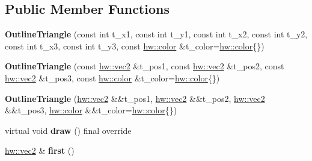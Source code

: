\subsection*{Public Member Functions}
\begin{DoxyCompactItemize}
\item 
\mbox{\label{classdummy__api_1_1OutlineTriangle_aaab9f7962173eb4337145d2138392365}} 
{\bfseries Outline\+Triangle} (const int t\+\_\+x1, const int t\+\_\+y1, const int t\+\_\+x2, const int t\+\_\+y2, const int t\+\_\+x3, const int t\+\_\+y3, const \mbox{\hyperlink{structhw_1_1color}{hw\+::color}} \&t\+\_\+color=\mbox{\hyperlink{structhw_1_1color}{hw\+::color}}\{\})
\item 
\mbox{\label{classdummy__api_1_1OutlineTriangle_a1f7689e4ea87c9e13a8ff4ff8be32383}} 
{\bfseries Outline\+Triangle} (const \mbox{\hyperlink{structhw_1_1vec2}{hw\+::vec2}} \&t\+\_\+pos1, const \mbox{\hyperlink{structhw_1_1vec2}{hw\+::vec2}} \&t\+\_\+pos2, const \mbox{\hyperlink{structhw_1_1vec2}{hw\+::vec2}} \&t\+\_\+pos3, const \mbox{\hyperlink{structhw_1_1color}{hw\+::color}} \&t\+\_\+color=\mbox{\hyperlink{structhw_1_1color}{hw\+::color}}\{\})
\item 
\mbox{\label{classdummy__api_1_1OutlineTriangle_ae001ee8f81b7441a481f7b170f3e517e}} 
{\bfseries Outline\+Triangle} (\mbox{\hyperlink{structhw_1_1vec2}{hw\+::vec2}} \&\&t\+\_\+pos1, \mbox{\hyperlink{structhw_1_1vec2}{hw\+::vec2}} \&\&t\+\_\+pos2, \mbox{\hyperlink{structhw_1_1vec2}{hw\+::vec2}} \&\&t\+\_\+pos3, \mbox{\hyperlink{structhw_1_1color}{hw\+::color}} \&\&t\+\_\+color=\mbox{\hyperlink{structhw_1_1color}{hw\+::color}}\{\})
\item 
\mbox{\label{classdummy__api_1_1OutlineTriangle_a63e6e514a101f1c196d2a81790769081}} 
virtual void {\bfseries draw} () final override
\item 
\mbox{\label{classdummy__api_1_1OutlineTriangle_a933963a3930a5c4e06ec8ec932ccf4a9}} 
\mbox{\hyperlink{structhw_1_1vec2}{hw\+::vec2}} \& {\bfseries first} ()
\item 
\mbox{\label{classdummy__api_1_1OutlineTriangle_a0207b6fcfff22d82f46dc447531a8936}} 

\end{DoxyCompactItemize}
